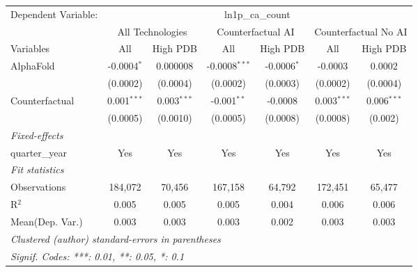 \begingroup
\centering
\begin{tabular}{lcccccc}
   \tabularnewline \midrule \midrule
   Dependent Variable: & \multicolumn{6}{c}{ln1p\_ca\_count}\\
 & \multicolumn{2}{c}{All Technologies} & \multicolumn{2}{c}{Counterfactual AI} & \multicolumn{2}{c}{Counterfactual No AI} \\
\cmidrule(lr){1-1}\cmidrule(lr){2-3} \cmidrule(lr){4-5} \cmidrule(lr){6-7}
Variables & \multicolumn{1}{c}{All} & \multicolumn{1}{c}{High PDB} & \multicolumn{1}{c}{All} & \multicolumn{1}{c}{High PDB} & \multicolumn{1}{c}{All} & \multicolumn{1}{c}{High PDB} \\
\cmidrule(lr){1-1}\cmidrule(lr){2-2} \cmidrule(lr){3-3} \cmidrule(lr){4-4} \cmidrule(lr){5-5} \cmidrule(lr){6-6} \cmidrule(lr){7-7}
   AlphaFold      & -0.0004$^{*}$ & 0.000008      & -0.0008$^{***}$ & -0.0006$^{*}$ & -0.0003       & 0.0002\\   
                  & (0.0002)      & (0.0004)      & (0.0002)        & (0.0003)      & (0.0002)      & (0.0004)\\   
   Counterfactual & 0.001$^{***}$ & 0.003$^{***}$ & -0.001$^{**}$   & -0.0008       & 0.003$^{***}$ & 0.006$^{***}$\\   
                  & (0.0005)      & (0.0010)      & (0.0005)        & (0.0008)      & (0.0008)      & (0.002)\\   
   \midrule
   \emph{Fixed-effects}\\
   quarter\_year  & Yes           & Yes           & Yes             & Yes           & Yes           & Yes\\  
   \midrule
   \emph{Fit statistics}\\
   Observations   & 184,072       & 70,456        & 167,158         & 64,792        & 172,451       & 65,477\\  
   R$^2$          & 0.005         & 0.005         & 0.005           & 0.004         & 0.006         & 0.006\\  
Mean(Dep. Var.) & 0.003 & 0.003 & 0.003 & 0.002 & 0.003 & 0.003 \\
   \midrule \midrule
   \multicolumn{7}{l}{\emph{Clustered (author) standard-errors in parentheses}}\\
   \multicolumn{7}{l}{\emph{Signif. Codes: ***: 0.01, **: 0.05, *: 0.1}}\\
\end{tabular}
\par\endgroup
